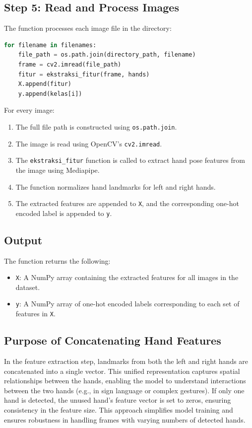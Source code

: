 \subsection*{Step 5: Read and Process Images}
The function processes each image file in the directory:
\begin{lstlisting}[language=Python]
	for filename in filenames:
	file_path = os.path.join(directory_path, filename)
	frame = cv2.imread(file_path)
	fitur = ekstraksi_fitur(frame, hands)
	X.append(fitur)
	y.append(kelas[i])
\end{lstlisting}
For every image:
\begin{enumerate}
	\item The full file path is constructed using \texttt{os.path.join}.
	\item The image is read using OpenCV's \texttt{cv2.imread}.
	\item The \texttt{ekstraksi\_fitur} function is called to extract hand pose features from the image using Mediapipe.
	\item The function normalizes hand landmarks for left and right hands.
	\item The extracted features are appended to \texttt{X}, and the corresponding one-hot encoded label is appended to \texttt{y}.
\end{enumerate}

\subsection*{Output}
The function returns the following:
\begin{itemize}
	\item \texttt{X}: A NumPy array containing the extracted features for all images in the dataset.
	\item \texttt{y}: A NumPy array of one-hot encoded labels corresponding to each set of features in \texttt{X}.
\end{itemize}

\subsection*{Purpose of Concatenating Hand Features}
In the feature extraction step, landmarks from both the left and right hands are concatenated into a single vector. This unified representation captures spatial relationships between the hands, enabling the model to understand interactions between the two hands (e.g., in sign language or complex gestures). If only one hand is detected, the unused hand’s feature vector is set to zeros, ensuring consistency in the feature size. This approach simplifies model training and ensures robustness in handling frames with varying numbers of detected hands.

